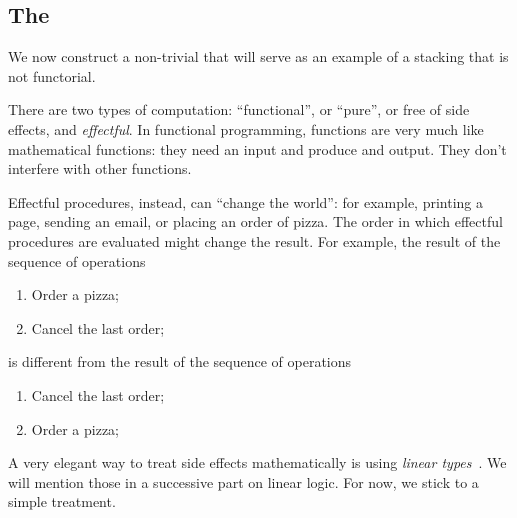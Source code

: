%

\subsection{The  \Effects}

We now construct a non-trivial  that will serve as an example of a stacking  that is not functorial.

There are two types of computation: ``functional'', or ``pure'', or free of side effects, and \emph{effectful}.
In functional programming, functions are very much like mathematical functions: they need an input and produce and output.
They don't interfere with other functions.

Effectful procedures, instead, can ``change the world'': for example, printing a page, sending an email, or placing an order of pizza.
The order in which effectful procedures are evaluated might change the result.
For example, the result of the sequence of operations
%
\begin{enumerate}
    \item Order a pizza;
    \item Cancel the last order;
\end{enumerate}
%
is different from the result of the sequence of operations
%
\begin{enumerate}
    \item Cancel the last order;
    \item Order a pizza;
\end{enumerate}

A very elegant way to treat side effects mathematically is using \emph{linear types}~\cite{Wadler90lineartypes}.
We will mention those in a successive part on linear logic.
For now, we stick to a simple treatment.

\begin{marginfigure}
    \centering
    \\
    \caption{}
    \label{fig:effects12}
\end{marginfigure}

